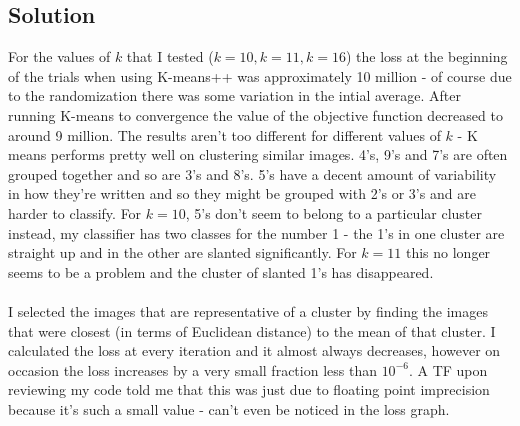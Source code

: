 \documentclass[submit]{harvardml}
\begin{document}
	\subsection*{Solution}
	
	For the values of $k$ that I tested ($k = 10, k = 11, k = 16$) the loss at the beginning of the trials when using K-means++ was approximately 10 million - of course due to the randomization there was some variation in the intial average.  After running K-means to convergence the value of the objective function decreased to around 9 million.  The results aren't too different for different values of $k$ - K means performs pretty well on clustering similar images.  4's, 9's and 7's are often grouped together and so are 3's and 8's.  5's have a decent amount of variability in how they're written and so they might be grouped with 2's or 3's and are harder to classify. For $k=10$, 5's don't seem to belong to a particular cluster instead, my classifier has two classes for the number 1 - the 1's in one cluster are straight up and in the other are slanted significantly. For $k = 11$ this no longer seems to be a problem and the cluster of slanted 1's has disappeared.  \\\\
	I selected the images that are representative of a cluster by finding the images that were closest (in terms of Euclidean distance) to the mean of that cluster.  I calculated the loss at every iteration and it almost always decreases, however on occasion the loss increases by a very small fraction less than $10^{-6}$.  A TF upon reviewing my code told me that this was just due to floating point imprecision because it's such a small value - can't even be noticed in the loss graph.  \\
	
\end{document}
